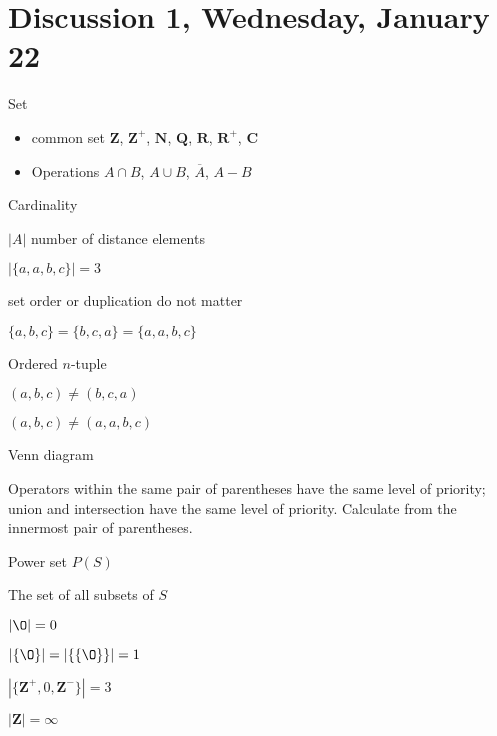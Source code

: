 \section{Discussion 1, Wednesday, January 22}

Set

\begin{itemize}
\item common set $\mathbf{Z}$, $\mathbf{Z}^{+}$, $\mathbf{N}$, $\mathbf{Q}$, $\mathbf{R}$, $\mathbf{R}^{+}$, $\mathbf{C}$
\item Operations $A\cap B$, $A\cup B$, $\overline A$, $A - B$
\end{itemize}

Cardinality 

$|A|$ number of distance elements

\begin{ex}
$|\{a, a, b, c\}| = 3$
\end{ex}

\begin{remark}
set order or duplication do not matter

$\{a, b, c\} = \{b, c, a\} = \{a, a, b, c\}$

\end{remark}

Ordered $n$-tuple

\begin{ex}
$(a, b, c) \neq (b, c, a)$

$(a, b, c) \neq (a, a, b, c)$
\end{ex}

\begin{prob}

Venn diagram

\end{prob}

\begin{remark}

Operators within the same pair of parentheses have the same level of priority; union and intersection have the same level of priority. Calculate from the innermost pair of parentheses.

\end{remark}


Power set $P(S)$

The set of all subsets of $S$

\begin{prob}
$|\O| = 0$

$|\{\O\}| = |\{\{\O\}\}| = 1$

$|\{\mathbf{Z}^{+}, 0, \mathbf{Z}^{-}\}| = 3$

$|\mathbf{Z}| = \infty$
\end{prob}

